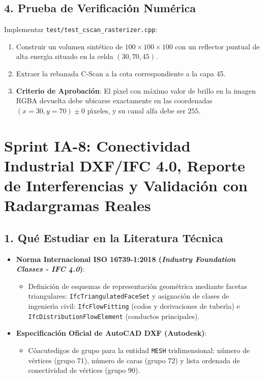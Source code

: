 \documentclass[11pt,a4paper]{article}
\begin{document}
\subsection{4. Prueba de Verificaci{\'o}n Num{\'e}rica}
Implementar \texttt{test/test\_cscan\_rasterizer.cpp}:
\begin{enumerate}
    \item Construir un volumen sint{\'e}tico de $100 \times 100 \times 100$ con un reflector puntual de alta energ{\'\i}a situado en la celda $(30, 70, 45)$.
    \item Extraer la rebanada C-Scan a la cota correspondiente a la capa 45.
    \item \textbf{Criterio de Aprobaci{\'o}n}: El p{\'\i}xel con m{\'a}ximo valor de brillo en la imagen RGBA devuelta debe ubicarse exactamente en las coordenadas $(x=30, y=70) \pm 0$ p{\'\i}xeles, y su canal alfa debe ser $255$.
\end{enumerate}

\newpage

\section{Sprint IA-8: Conectividad Industrial DXF/IFC 4.0, Reporte de Interferencias y Validaci{\'o}n con Radargramas Reales}

\subsection{1. Qu{\'e} Estudiar en la Literatura T{\'e}cnica}
\begin{itemize}
    \item \textbf{Norma Internacional ISO 16739-1:2018 (\textit{Industry Foundation Classes - IFC 4.0})}:
    \begin{itemize}
        \item Definici{\'o}n de esquemas de representaci{\'o}n geom{\'e}trica mediante facetas triangulares: \texttt{IfcTriangulatedFaceSet} y asignaci{\'o}n de clases de ingenier{\'\i}a civil: \texttt{IfcFlowFitting} (codos y derivaciones de tuber{\'\i}a) e \texttt{IfcDistributionFlowElement} (conductos principales).
    \end{itemize}
    \item \textbf{Especificaci{\'o}n Oficial de AutoCAD DXF (Autodesk)}:
    \begin{itemize}
        \item C{\'oacute}digos de grupo para la entidad \texttt{MESH} tridimensional: n{\'u}mero de v{\'e}rtices (grupo 71), n{\'u}mero de caras (grupo 72) y lista ordenada de conectividad de v{\'e}rtices (grupo 90).
    \end{itemize}
\end{itemize}
\end{document}
